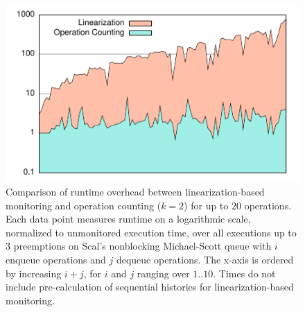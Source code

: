 \begin{figure}
  \centering
  \includegraphics[width=\linewidth]{figures/lin-vs-counting-time}
  \caption{Comparison of runtime overhead between linearization-based monitoring
    and operation counting ($k=2$) for up to $20$ operations. Each data point
    measures runtime on a logarithmic scale, normalized to unmonitored
    execution time, over all executions up to $3$ preemptions on Scal's
    nonblocking Michael-Scott queue with $i$ enqueue operations and $j$ dequeue
    operations. The x-axis is ordered by increasing $i+j$, for $i$ and $j$
    ranging over $1..10$. Times do not include pre-calculation of sequential
    histories for linearization-based monitoring.
  }
  \label{fig:data:runtime}
\end{figure}
